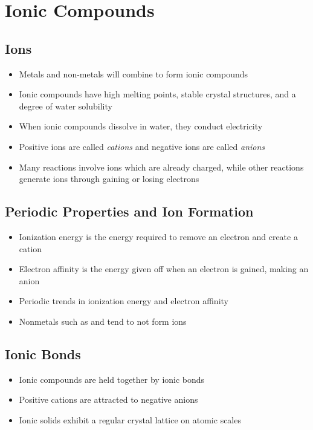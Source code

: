 \documentclass[12pt, openany, letterpaper]{memoir}
\begin{document}
\chapter{Ionic Compounds}
\section{Ions}
\begin{itemize}
	\item Metals and non-metals will combine to form ionic compounds
	\item Ionic compounds have high melting points, stable crystal structures, and a degree of water solubility
	\item When ionic compounds dissolve in water, they conduct electricity
	\item Positive ions are called \emph{cations} and negative ions are called \emph{anions}
	\item Many reactions involve ions which are already charged, while other reactions generate ions through gaining or losing electrons
\end{itemize}
\section{Periodic Properties and Ion Formation}
\begin{itemize}
	\item Ionization energy is the energy required to remove an electron and create a cation
	\item Electron affinity is the energy given off when an electron is gained, making an anion
	\item Periodic trends in ionization energy and electron affinity
	\item Nonmetals such as  and  tend to not form ions
\end{itemize}
\section{Ionic Bonds}
\begin{itemize}
	\item Ionic compounds are held together by ionic bonds
	\item Positive cations are attracted to negative anions
	\item Ionic solids exhibit a regular crystal lattice on atomic scales
\end{itemize}
\end{document}
